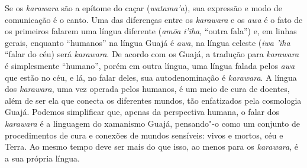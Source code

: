 \forceindent
Se os \emph{karawara} são a epítome do caçar (\emph{watama'a}), sua
expressão e modo de comunicação é o canto. Uma das diferenças entre os
\emph{karawara} e os \emph{awa} é o fato de os primeiros falarem uma
língua diferente (\emph{amõa} \emph{i'ĩha}, ``outra fala'') e, em linhas
gerais, enquanto ``humanos'' na língua Guajá é \emph{awa}, na língua
celeste (\emph{iwa} \emph{'ĩha} ``falar do céu) será \emph{karawara}. De
acordo com os Guajá, a tradução para \emph{karawara} é simplesmente
``humano'', porém em outra língua, uma língua falada pelos \emph{awa}
que estão no céu, e lá, no falar deles, sua autodenominação é
\emph{karawara}. A língua dos \emph{karawara}, uma vez operada pelos
humanos, é um meio de cura de doentes, além de ser ela que conecta os
diferentes mundos, tão enfatizados pela cosmologia Guajá. Podemos
simplificar que, apenas da perspectiva humana, o falar dos
\emph{karawara} é a linguagem do xamanismo Guajá, pensando"-o como um
conjunto de procedimentos de cura e conexões de mundos sensíveis: vivos
e mortos, céu e Terra. Ao mesmo tempo deve ser mais do que isso, ao
menos para os \emph{karawara}, é a sua própria língua.

